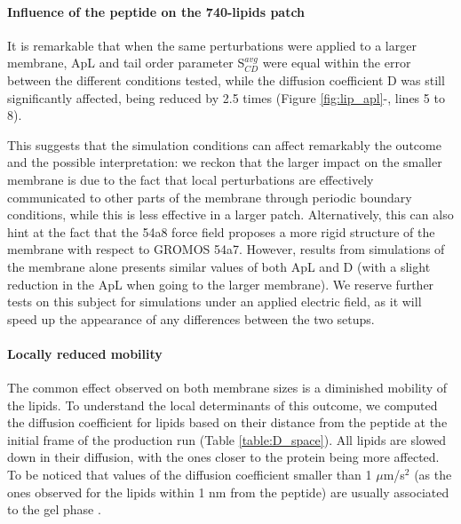 \paragraph{Influence of the peptide on the 740-lipids patch} It is remarkable that when the same perturbations were applied to a larger membrane, ApL and tail order parameter S$^{avg}_{CD}$ were equal within the error between the different conditions tested, while the diffusion coefficient D was still significantly affected, being reduced by 2.5 times (Figure \ref{fig:lip_apl}-, lines 5 to 8).

This suggests that the simulation conditions can affect remarkably the outcome and the possible interpretation: we reckon that the larger impact on the smaller membrane is due to the fact that local perturbations are effectively communicated to other parts of the membrane through periodic boundary conditions, while this is less effective in a larger patch.
%
Alternatively, this can also hint at the fact that the 54a8 force field proposes a more rigid structure of the membrane with respect to GROMOS 54a7. However, results from simulations of the membrane alone presents similar values of both ApL and D (with a slight reduction in the ApL when going to the larger membrane).
%
We reserve further tests on this subject for simulations under an applied electric field, as it will speed up the appearance of any differences between the two setups.


\paragraph{Locally reduced mobility} The common effect observed on both membrane sizes is a diminished mobility of the lipids.
%
To understand the local determinants of this outcome, we computed the diffusion coefficient for lipids based on their distance from the peptide at the initial frame of the production run (Table \ref{table:D_space}).
%
All lipids are slowed down in their diffusion, with the ones closer to the protein being more affected. To be noticed that values of the diffusion coefficient smaller than 1 $\mu$m/s$^2$ (as the ones observed for the lipids within 1 nm from the peptide) are usually associated to the gel phase \cite{Scomparin2009}.

